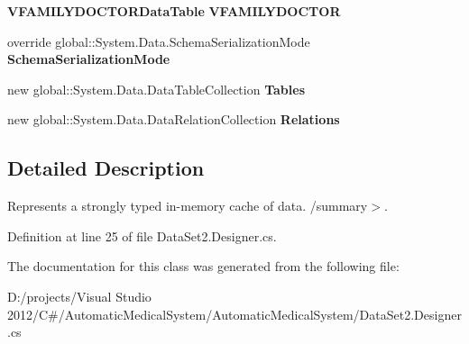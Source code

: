 \begin{CompactItemize}
\item 
{\bf VFAMILYDOCTORDataTable} \textbf{VFAMILYDOCTOR}\hspace{0.3cm}{\tt  [get]}\label{class_automatic_medical_system_1_1_data_set2_6adfb2d5ab869a0804f765481b2bfc3a}

\item 
override global::System.Data.SchemaSerializationMode \textbf{SchemaSerializationMode}\hspace{0.3cm}{\tt  [get, set]}\label{class_automatic_medical_system_1_1_data_set2_bc6c226ba3d8d068eba44ede99b66246}

\item 
new global::System.Data.DataTableCollection \textbf{Tables}\hspace{0.3cm}{\tt  [get]}\label{class_automatic_medical_system_1_1_data_set2_f90a9896513457da052de4d521ea8ee2}

\item 
new global::System.Data.DataRelationCollection \textbf{Relations}\hspace{0.3cm}{\tt  [get]}\label{class_automatic_medical_system_1_1_data_set2_0bbc186e84d28bb5ed830d6ecfe9735f}

\end{CompactItemize}


\subsection{Detailed Description}
Represents a strongly typed in-memory cache of data. /summary$>$. 

Definition at line 25 of file DataSet2.Designer.cs.

The documentation for this class was generated from the following file:\begin{CompactItemize}
\item 
D:/projects/Visual Studio 2012/C\#/AutomaticMedicalSystem/AutomaticMedicalSystem/DataSet2.Designer.cs\end{CompactItemize}

